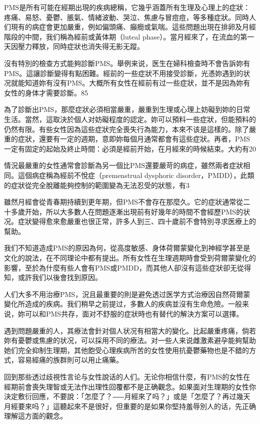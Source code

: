 \documentclass[12pt,UTF8]{ctexbook}
\begin{document}
PMS是所有可能在經期出現的疾病總稱，它幾乎涵蓋所有生理及心理上的症狀：疼痛、易怒、憂鬱、脹氣、情緒波動、哭泣、焦慮与冒痘痘，等多種症狀。同時人们現有的病症會更加嚴重，例如偏頭痛、癲癇或氣喘。這些問題出現在排卵及月經階段的中間，我们稱為經前或黃体期（luteal phase）。當月經來了，在流血的第一天因壓力釋放，同時症狀也消失得无影无蹤。

沒有特別的檢查方式能夠診斷PMS。舉例来说，医生在婦科檢查時不會告訴妳有PMS。這讓診斷變得有點困難。經前的一些症狀不用接受診斷，光憑妳遇到的状况就能知道妳有沒有PMS。大概所有女性在經前有过一些症狀，並不是因為妳有女性的身体才需要診斷。85%

為了診斷出PMS，那麼症狀必須相當嚴重，嚴重到生理或心理上妨礙到妳的日常生活。當然，這取決於個人对妨礙程度的認定。妳可以預料一些症狀，但能預料的仍然有限。有些女性因為這些症狀完全喪失行為能力，本來不该是這樣的。除了嚴重的症狀，還要有一定的週期，意即妳每個月通常都會有這些症狀。再者，PMS一定有固定的起始及終止時間：必須是經前开始，在月經來的時候結束。大約有20%

情況最嚴重的女性通常會診斷為另一個比PMS還要嚴苛的病症，雖然兩者症狀相同。這個病症稱為經前不悅症（premenstrual dysphoric disorder，PMDD），此類的症狀從完全脫離能夠控制的範圍變為无法忍受的狀態，有3%

雖然月經會從青春期持續到更年期，但PMS不會存在那麼久。它的症狀通常從二十多歲开始，所以大多數人在問題逐漸出現前有好幾年的時間不會經歷PMS的状况。症狀變得愈來愈嚴重也很正常，許多人到三、四十歲前不會特別寻求医療上的幫助。

我们不知道造成PMS的原因為何，從高度敏感、身体荷爾蒙變化到神經学甚至是文化的說法，在不同理论中都有提出。所有女性在生理週期時會受到荷爾蒙變化的影響，至於為什麼有些人會有PMS或PMDD，而其他人卻沒有這些症狀卻无從得知，或許我们以後會找到原因。

人们大多不用治療PMS，況且最重要的則是避免透过医学方式治療因自然荷爾蒙變化所造成的疾病。我们稍早之前提过，多數人的疾病並沒有生命危險。一般来说，妳可以和PMS共存，面对不舒服的症狀時也有替代的解決方案可以選擇。

遇到問題嚴重的人，其療法會針对個人状况有相當大的變化。比起嚴重疼痛，倘若妳有憂鬱或焦慮的状况，可以採用不同的療法。对一些人来说雌激素避孕能夠幫助她们完全抑制生理期，其他飽受心理疾病所苦的女性使用抗憂鬱藥物也是不錯的方式，容易經痛的族群則可以用止痛藥。

回到那些透过歧視性言论与女性說话的人们。无论你相信什麼，有PMS的女性在經期前會喪失理智或无法作出理性回覆都不是正确觀念。如果面对生理期的女性你決定敷衍回應，不要說：「怎麼了？⸺月經來了吗？」或是「怎麼了？再过幾天月經要來吗？」這聽起來不是很好，但重要的是如果你堅持羞辱別人的话，先正确理解這方面的觀念。
\end{document}
